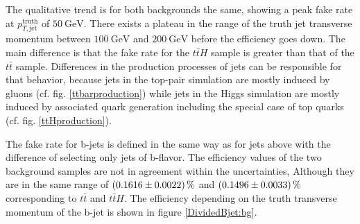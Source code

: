%
The qualitative trend is for both backgrounds the same, showing a peak fake rate at $p_{T,\text{jet}}^{\text{truth}}$ of $\SI{50}{\giga\electronvolt}$. There exists a plateau in the range of the truth jet transverse momentum between $\SI{100}{\giga\electronvolt}$ and $\SI{200}{\giga\electronvolt}$ before the efficiency goes down. The main difference is that the fake rate for the $t\bar{t}H$ sample is greater than that of the $t\bar{t}$ sample. Differences in the production processes of jets can be responsible for that behavior, because jets in the top-pair simulation are mostly induced by gluons (cf. fig. \ref{ttbarproduction}) while jets in the Higgs simulation are mostly induced by associated quark generation including the special case of top quarks (cf. fig. \ref{ttHproduction}).\par
The fake rate for b-jets is defined in the same way as for jets above with the difference of selecting only jets of b-flavor. The efficiency values of the two background samples are not in agreement within the uncertainties, Although they are in the same range of $\SI{0.1616\pm 0.0022}{\percent}$ and $\SI{0.1496\pm 0.0033}{\percent}$ corresponding to $t\bar{t}$ and $t\bar{t}H$. The efficiency depending on the truth transverse momentum of the b-jet is shown in figure \ref{DividedBjet:bg}.
%
